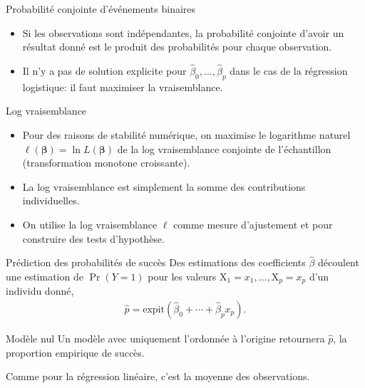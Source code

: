 \documentclass[
  ignorenonframetext,
]{beamer}
\providecommand{\tightlist}{%
  \setlength{\itemsep}{0pt}\setlength{\parskip}{0pt}}\usepackage{longtable,booktabs,array}
\begin{document}
\begin{frame}{Probabilité conjointe d'événements binaires}
\protect\hypertarget{probabilituxe9-conjointe-duxe9vuxe9nements-binaires}{}
\begin{itemize}
\tightlist
\item
  Si les observations sont indépendantes, la probabilité conjointe
  d'avoir un résultat donné est le produit des probabilités pour chaque
  observation.
\item
  Il n'y a pas de solution explicite pour
  \(\widehat{\beta}_0, \ldots, \widehat{\beta}_p\) dans le cas de la
  régression logistique: il faut maximiser la vraisemblance.
\end{itemize}
\end{frame}

\begin{frame}{Log vraisemblance}
\protect\hypertarget{log-vraisemblance}{}
\begin{itemize}
\tightlist
\item
  Pour des raisons de stabilité numérique, on maximise le logarithme
  naturel \(\ell(\boldsymbol{\beta}) = \ln L(\boldsymbol{\beta})\) de la
  log vraisemblance conjointe de l'échantillon (transformation monotone
  croissante).
\item
  La log vraisemblance est simplement la somme des contributions
  individuelles.
\item
  On utilise la log vraisemblance \(\ell\) comme mesure d'ajustement et
  pour construire des tests d'hypothèse.
\end{itemize}
\end{frame}

\begin{frame}{Prédiction des probabilités de succès}
\protect\hypertarget{pruxe9diction-des-probabilituxe9s-de-succuxe8s}{}
Des estimations des coefficients \(\widehat{\beta}\) découlent une
estimation de \(\Pr(Y=1)\) pour les valeurs
\(\mathrm{X}_1=x_1, \ldots, \mathrm{X}_p=x_p\) d'un individu donné,
\begin{align*}
 \widehat{p} = \textrm{expit}(\widehat{\beta}_0 + \cdots + \widehat{\beta}_px_p).
\end{align*}
\end{frame}

\begin{frame}{Modèle nul}
\protect\hypertarget{moduxe8le-nul}{}
Un modèle avec uniquement l'ordonnée à l'origine retournera
\(\widehat{p}\), la proportion empirique de succès.

Comme pour la régression linéaire, c'est la moyenne des observations.
\end{frame}
\end{document}
